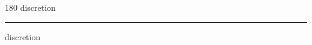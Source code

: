 
\begin{frame}
\begin{center}
\begin{turn}{180}
{\fontsize{2.5cm}{1em}\selectfont discretion}
\end{turn}
\vspace{1em}\par  
\hrule
\vspace{1em}\par  
{\fontsize{2.5cm}{1em}\selectfont discretion}
\end{center}
\end{frame}
